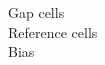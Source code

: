 \documentclass[preview]{standalone}
\begin{document}
Gap cells \\ Reference cells \\ Bias\\
\end{document}
